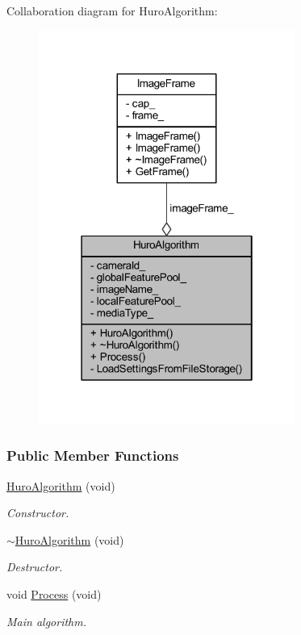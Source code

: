 Collaboration diagram for Huro\-Algorithm\-:
\nopagebreak
\begin{figure}[H]
\begin{center}
\leavevmode
\includegraphics[width=238pt]{class_huro_algorithm__coll__graph}
\end{center}
\end{figure}
\subsubsection*{Public Member Functions}
\begin{DoxyCompactItemize}
\item 
\hyperlink{group___object_recognition_a5213ab22da2dba36f16262c1a84ec261}{Huro\-Algorithm} (void)
\begin{DoxyCompactList}\small\item\em Constructor. \end{DoxyCompactList}\item 
\hyperlink{group___object_recognition_a0c00c5a74d3415f926f599c2ea9cedce}{$\sim$\-Huro\-Algorithm} (void)
\begin{DoxyCompactList}\small\item\em Destructor. \end{DoxyCompactList}\item 
void \hyperlink{group___object_recognition_ac2e91407459c4ebac0b33f7e7570022d}{Process} (void)
\begin{DoxyCompactList}\small\item\em Main algorithm. \end{DoxyCompactList}\end{DoxyCompactItemize}
